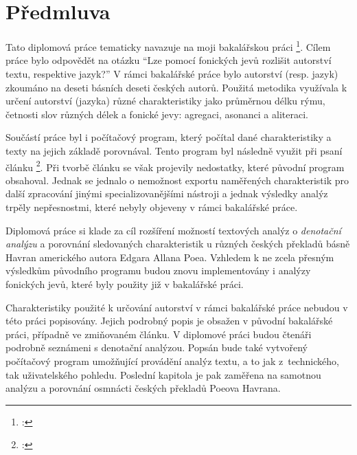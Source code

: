 \documentclass[dp.tex]{subfiles}
\begin{document}
\chapter*{Předmluva}
\label{chap:predmluva} 

Tato diplomová práce tematicky navazuje na moji bakalářskou práci \footnote{\cite{Slahora2012}: }. Cílem práce bylo odpovědět na otázku \enquote{Lze pomocí fonických jevů rozlišit autorství textu, respektive jazyk?} V rámci bakalářské práce bylo autorství (resp. jazyk) zkoumáno na deseti básních deseti českých autorů. Použitá metodika využívala k určení autorství (jazyka) různé charakteristiky jako průměrnou délku rýmu, četnosti slov různých délek a fonické jevy: agregaci, asonanci a aliteraci.

Součástí práce byl i počítačový program, který počítal dané charakteristiky a texty na jejich základě porovnával. Tento program byl následně využit při psaní článku \footnote{\cite{Marek2013}: }. Při tvorbě článku se však projevily nedostatky, které původní program obsahoval. Jednak se jednalo o nemožnost exportu naměřených charakteristik pro další zpracování jinými specializovanějšími nástroji a jednak výsledky analýz trpěly nepřesnostmi, které nebyly objeveny v rámci bakalářské práce.

Diplomová práce si klade za cíl rozšíření možností textových analýz o \textit{denotační analýzu} a porovnání sledovaných charakteristik u různých českých překladů básně Havran amerického autora Edgara Allana Poea. Vzhledem k ne zcela přesným výsledkům původního programu budou znovu implementovány i analýzy fonických jevů, které byly použity již v bakalářské práci.

Charakteristiky použité k určování autorství v rámci bakalářské práce nebudou v této práci popisovány. Jejich podrobný popis je obsažen v původní bakalářské práci, případně ve zmiňovaném článku. V diplomové práci budou čtenáři podrobně seznámeni s denotační analýzou. Popsán bude také vytvořený počítačový program umožňující provádění analýz textu, a to jak z~technického, tak uživatelského pohledu. Poslední kapitola je pak zaměřena na samotnou analýzu a porovnání osmnácti českých překladů Poeova Havrana.
\end{document}
